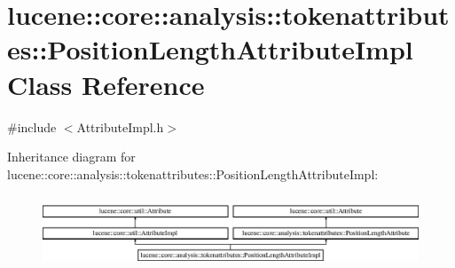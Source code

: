 \hypertarget{classlucene_1_1core_1_1analysis_1_1tokenattributes_1_1PositionLengthAttributeImpl}{}\section{lucene\+:\+:core\+:\+:analysis\+:\+:tokenattributes\+:\+:Position\+Length\+Attribute\+Impl Class Reference}
\label{classlucene_1_1core_1_1analysis_1_1tokenattributes_1_1PositionLengthAttributeImpl}


{\ttfamily \#include $<$Attribute\+Impl.\+h$>$}

Inheritance diagram for lucene\+:\+:core\+:\+:analysis\+:\+:tokenattributes\+:\+:Position\+Length\+Attribute\+Impl\+:\begin{figure}[H]
\begin{center}
\leavevmode
\includegraphics[height=2.176166cm]{classlucene_1_1core_1_1analysis_1_1tokenattributes_1_1PositionLengthAttributeImpl}
\end{center}
\end{figure}
